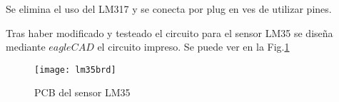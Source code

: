 Se elimina el uso del LM317 y se conecta por plug en ves de utilizar pines.


Tras haber modificado y testeado el circuito para el sensor LM35 se diseña mediante $eagleCAD$
el circuito impreso. Se puede ver en la Fig.\ref{fig:lm35pcb}
\begin{figure}[H] %
  \begin{center}
    \texttt{[image: lm35brd]} 
  \end{center}
  \caption{PCB del sensor LM35}
  \label{fig:lm35pcb}
\end{figure}